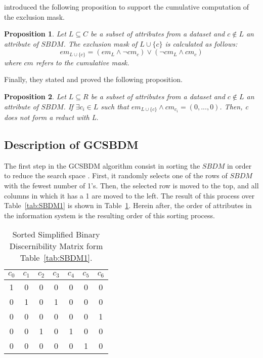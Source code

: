 \documentclass[authoryear,preprint,review,12pt]{elsarticle}
\newtheorem{proposition}{Proposition}
\begin{document}
	\cite{Lias13} introduced the following proposition to support the cumulative computation of the exclusion mask.
	
	\begin{proposition}\label{prop:cumul} 
		Let $L \subseteq C$ be a subset of attributes from a dataset and $c \notin L$ an attribute of $SBDM$.
		The exclusion mask of $L \cup \lbrace c\rbrace$ is calculated as follows:
		$$em_{L \cup \lbrace c\rbrace}=(em_L \wedge \neg cm_c) \vee (\neg cm_L \wedge cm_c)$$
		where $cm$ refers to the cumulative mask.
	\end{proposition}
	
	Finally, they stated and proved the following proposition.
	
	\begin{proposition}\label{prop:exclude} 
		Let $L \subseteq R$ be a subset of attributes from a dataset and $c \notin L$ an attribute of $SBDM$.
		If $\exists c_i \in L$ such that $em_{L \cup \lbrace c\rbrace} \wedge cm_{c_i}=(0,...,0)$. Then, c
		does not form a reduct with L.
	\end{proposition}

\subsection{Description of GCSBDM}\label{description}

	The first step in the GCSBDM algorithm consist in sorting the $SBDM$ in order to reduce the search space
	\citep{Sanchez07}. First, it randomly selects one of the rows of $SBDM$ with the fewest number of 1's. Then, 
	the selected row is moved to the top, and all columns in which it has a 1 are moved to the left. 
	The result of this process over Table~\ref{tab:SBDM1} is shown in Table~\ref{tab:SSBDM1}. Herein after, the order of attributes in the information system is the resulting order of this sorting process.
		
	\begin{table}[htb]
		\caption{Sorted Simplified Binary Discernibility Matrix form Table~\ref{tab:SBDM1}.}
		\centering
		\begin{tabular}{ccccccc}\label{tab:SSBDM1}
			$c_0$ & $c_1$ & $c_2$ & $c_3$ & $c_4$ & $c_5$ & $c_6$\\
			\hline
			1&0&0&0&0&0&0\\
			0&1&0&1&0&0&0\\
			0&0&0&0&0&0&1\\
			0&0&1&0&1&0&0\\
			0&0&0&0&0&1&0\\
		\end{tabular}             
	\end{table}  
		
\end{document}

